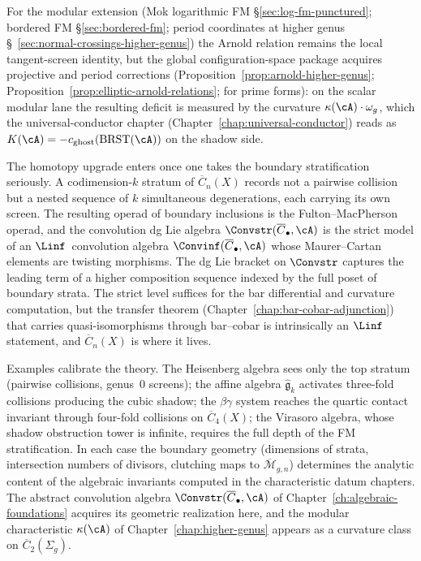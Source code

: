 For the modular extension (Mok logarithmic FM
\S\ref{sec:log-fm-punctured}; bordered FM
\S\ref{sec:bordered-fm}; period coordinates at higher genus
\S~\ref{sec:normal-crossings-higher-genus}) the Arnold relation
remains the local tangent-screen identity, but the global
configuration-space package acquires projective and period corrections
(Proposition~\ref{prop:arnold-higher-genus};
Proposition~\ref{prop:elliptic-arnold-relations}; \cite{Fay73}
for prime forms): on the scalar modular lane the resulting deficit is
measured by the curvature $\kappa(\cA) \cdot \omega_g$, which the universal-conductor
chapter (Chapter~\ref{chap:universal-conductor}) reads as
$K(\cA) = -c_{\mathrm{ghost}}(\mathrm{BRST}(\cA))$ on the
shadow side.

The homotopy upgrade enters once one takes the boundary stratification
seriously. A codimension-$k$ stratum of $\overline{C}_n(X)$ records
not a pairwise collision but a nested sequence of $k$ simultaneous
degenerations, each carrying its own screen. The resulting operad of
boundary inclusions is the Fulton--MacPherson operad, and the
convolution dg Lie algebra
$\Convstr(\overline{C}_\bullet, \cA)$ is the strict model of an
$\Linf$~convolution algebra $\Convinf(\overline{C}_\bullet, \cA)$
whose Maurer--Cartan elements are twisting morphisms. The dg Lie
bracket on $\Convstr$ captures the leading term of a higher
composition sequence indexed by the full poset of boundary strata.
The strict level suffices for the bar differential and curvature
computation, but the transfer theorem
(Chapter~\ref{chap:bar-cobar-adjunction}) that carries
quasi-isomorphisms through bar--cobar is intrinsically an $\Linf$
statement, and $\overline{C}_n(X)$ is where it lives.

Examples calibrate the theory. The Heisenberg algebra sees only the
top stratum (pairwise collisions, genus~$0$ screens); the affine
algebra $\widehat{\mathfrak{g}}_k$ activates three-fold collisions
producing the cubic shadow; the $\beta\gamma$ system reaches the
quartic contact invariant through four-fold collisions on
$\overline{C}_4(X)$; the Virasoro algebra, whose shadow obstruction
tower is infinite, requires the full depth of the FM stratification.
In each case the boundary geometry (dimensions of strata,
intersection numbers of divisors, clutching maps to
$\overline{\mathcal{M}}_{g,n}$) determines the analytic content of
the algebraic invariants computed in the characteristic datum chapters. The abstract
convolution algebra $\Convstr(\overline{C}_\bullet, \cA)$ of
Chapter~\ref{ch:algebraic-foundations} acquires its geometric
realization here, and the modular characteristic $\kappa(\cA)$ of
Chapter~\ref{chap:higher-genus} appears as a curvature class on
$\overline{C}_2(\Sigma_g)$.

